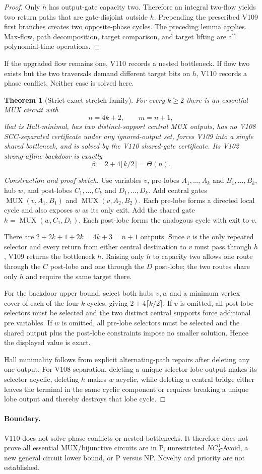 \documentclass[11pt]{article}
\newtheorem{theorem}{Theorem}
\begin{document}
\begin{proof}
Only $h$ has output-gate capacity two. Therefore an integral two-flow yields two
return paths that are gate-disjoint outside $h$. Prepending the prescribed V109
first branches creates two opposite-phase cycles. The preceding lemma applies.
Max-flow, path decomposition, target comparison, and target lifting are all
polynomial-time operations.
\end{proof}

If the upgraded flow remains one, V110 records a nested bottleneck. If flow two
exists but the two traversals demand different target bits on $h$, V110 records
a phase conflict. Neither case is solved here.

\begin{theorem}[Strict exact-stretch family]
For every $k\ge2$ there is an essential MUX circuit with
\[
 n=4k+2,\qquad m=n+1,
\]
that is Hall-minimal, has two distinct-support central MUX outputs, has no V108
SCC-separated certificate under any ignored-output set, forces V109 into a
single shared bottleneck, and is solved by the V110 shared-gate certificate.
Its V102 strong-affine backdoor is exactly
\[
 \beta=2+4\lceil k/2\rceil=\Theta(n).
\]
\end{theorem}

\begin{proof}[Construction and proof sketch]
Use variables $v$, pre-lobes $A_1,\ldots,A_k$ and $B_1,\ldots,B_k$, hub $w$,
and post-lobes $C_1,\ldots,C_k$ and $D_1,\ldots,D_k$. Add central gates
$\operatorname{MUX}(v,A_1,B_1)$ and $\operatorname{MUX}(v,A_2,B_2)$. Each
pre-lobe forms a directed local cycle and also exposes $w$ as its only exit.
Add the shared gate $h=\operatorname{MUX}(w,C_1,D_1)$. Each post-lobe forms the
analogous cycle with exit to $v$.

There are $2+2k+1+2k=4k+3=n+1$ outputs. Since $v$ is the only repeated selector
and every return from either central destination to $v$ must pass through $h$,
V109 returns the bottleneck $h$. Raising only $h$ to capacity two allows one
route through the $C$ post-lobe and one through the $D$ post-lobe; the two
routes share only $h$ and require the same target there.

For the backdoor upper bound, select both hubs $v,w$ and a minimum vertex cover
of each of the four $k$-cycles, giving $2+4\lceil k/2\rceil$. If $v$ is omitted,
all post-lobe selectors must be selected and the two distinct central supports
force additional pre variables. If $w$ is omitted, all pre-lobe selectors must
be selected and the shared output plus the post-lobe constraints impose no
smaller solution. Hence the displayed value is exact.

Hall minimality follows from explicit alternating-path repairs after deleting
any one output. For V108 separation, deleting a unique-selector lobe output makes
its selector acyclic, deleting $h$ makes $w$ acyclic, while deleting a central
bridge either leaves the terminal in the same cyclic component or requires
breaking a unique lobe output and thereby destroys that lobe cycle.
\end{proof}

\paragraph{Boundary.}
V110 does not solve phase conflicts or nested bottlenecks. It therefore does not
prove all essential MUX/bijunctive circuits are in P, unrestricted
$NC^0_3$-Avoid, a new general circuit lower bound, or P versus NP. Novelty and
priority are not established.
\end{document}
